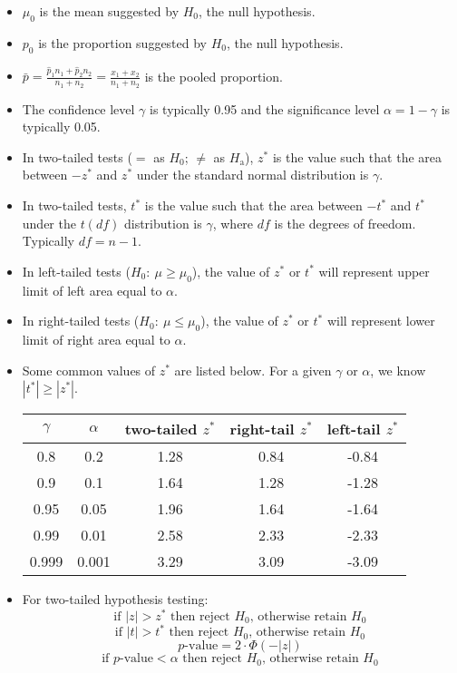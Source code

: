 \documentclass[12pt,letterpaper]{article}
\begin{document}
\begin{itemize}
\item $\mu_0$ is the mean suggested by $H_0$, the null hypothesis.
\item $p_0$ is the proportion suggested by $H_0$, the null hypothesis.
\item $\bar{p} = \frac{\hat{p}_1n_1+\hat{p}_2n_2}{n_1+n_2} = \frac{x_1+x_2}{n_1+n_2}$ is the pooled proportion.
\item The confidence level $\gamma$ is typically 0.95 and the significance level $\alpha = 1-\gamma$ is typically 0.05.
\item In two-tailed tests ($=$ as $H_0$; $\ne$ as $H_\text{a}$), $z^*$ is the value such that the area between $-z^*$ and $z^*$ under the standard normal distribution is $\gamma$.
\item In two-tailed tests, $t^*$ is the value such that the area between $-t^*$ and $t^*$ under the $t(df)$ distribution is $\gamma$, where $df$ is the degrees of freedom. Typically $df=n-1$.
\item In left-tailed tests ($H_0: ~\mu \ge \mu_0$), the value of $z^*$ or $t^*$ will represent upper limit of left area equal to $\alpha$.
\item In right-tailed tests ($H_0:~\mu \le \mu_0$), the value of $z^*$ or $t^*$ will represent lower limit of right area equal to $\alpha$.

\item Some common values of $z^*$ are listed below. For a given $\gamma$ or $\alpha$, we know $|t^*| \ge |z^*|$.
\begin{center}
\begin{tabular}{|c|c|c|c|c|}\hline
$\gamma$ & $\alpha$ & two-tailed $z^*$ & right-tail $z^*$ & left-tail $z^*$ \\ \hline
0.8 & 0.2 & 1.28 & 0.84 & -0.84 \\
0.9 & 0.1 & 1.64 & 1.28 & -1.28 \\
0.95 & 0.05 & 1.96 & 1.64 & -1.64 \\
0.99 & 0.01 & 2.58 & 2.33 & -2.33 \\
0.999 & 0.001 & 3.29 & 3.09 & -3.09 \\ \hline
\end{tabular}
\end{center}

\item For two-tailed hypothesis testing:
$$\text{if } |z| > z^* \text{ then reject } H_0 \text{, otherwise retain } H_0$$
$$\text{if } |t| > t^* \text{ then reject } H_0  \text{, otherwise retain } H_0$$
$$p\text{-value} = 2 \cdot \Phi(-|z|) $$
$$\text{if } p\text{-value} < \alpha \text{ then reject } H_0 \text{, otherwise retain } H_0$$
\end{itemize}
\end{document}
